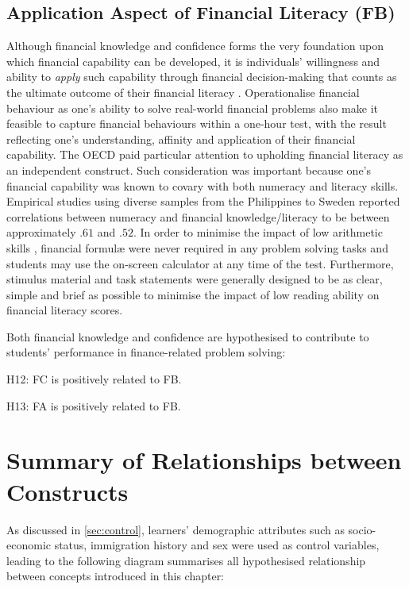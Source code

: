 \documentclass[a4paper,11pt,UKenglish,twoside,openright]{report}\usepackage[]{graphicx}\usepackage[]{color}
\begin{document}
\subsection{Application Aspect of Financial Literacy (FB)}

Although financial knowledge and confidence forms the very foundation upon which financial capability can be developed, it is individuals' willingness and ability to \emph{apply} such capability through financial decision-making that counts as the ultimate outcome of their financial literacy \parencite{huston:2010}. Operationalise financial behaviour as one's ability to solve real-world financial problems also make it feasible to capture financial behaviours within a one-hour test, with the result reflecting one's understanding, affinity and application of their financial capability. The OECD paid particular attention to upholding financial literacy as an independent construct. Such consideration was important because one's financial capability was known to covary with both numeracy \parencite{geiger:2020, ozkale:2020a, ozkale:2020b, sole:2014} and literacy \parencite{bay:2014} skills. Empirical studies using diverse samples from the Philippines \parencite{indefenso:2020} to Sweden \parencite{skagerlund:2018} reported correlations between numeracy and financial knowledge/literacy to be between approximately $.61$ and $.52$. In order to minimise the impact of low arithmetic skills \parencite{huston:2010}, financial formul{\ae} were never required in any problem solving tasks and students may use the on-screen calculator at any time of the test. Furthermore, stimulus material and task statements were generally designed to be as clear, simple and brief as possible to minimise the impact of low reading ability on financial literacy scores.

Both financial knowledge and confidence are hypothesised to contribute to students' performance in finance-related problem solving:
\begin{hyth}
    \item[H12:] FC is positively related to FB.
    \item[H13:] FA is positively related to FB.
\end{hyth}

\section{Summary of Relationships between Constructs}

As discussed in \cref{sec:control}, learners' demographic attributes such as socio-economic status, immigration history and sex were used as control variables, leading to the following diagram summarises all hypothesised relationship between concepts introduced in this chapter:
\end{document}
